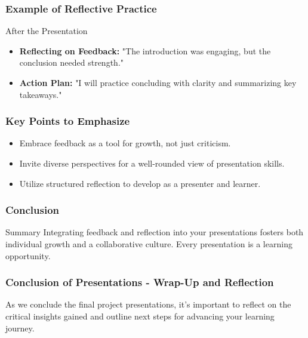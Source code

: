 \documentclass[aspectratio=169]{beamer}
\begin{document}
\begin{frame}[fragile]
    \frametitle{Example of Reflective Practice}
    \begin{block}{After the Presentation}
        \begin{itemize}
            \item \textbf{Reflecting on Feedback:} "The introduction was engaging, but the conclusion needed strength."
            \item \textbf{Action Plan:} "I will practice concluding with clarity and summarizing key takeaways."
        \end{itemize}
    \end{block}
\end{frame}

\begin{frame}[fragile]
    \frametitle{Key Points to Emphasize}
    \begin{itemize}
        \item Embrace feedback as a tool for growth, not just criticism.
        \item Invite diverse perspectives for a well-rounded view of presentation skills.
        \item Utilize structured reflection to develop as a presenter and learner.
    \end{itemize}
\end{frame}

\begin{frame}[fragile]
    \frametitle{Conclusion}
    \begin{block}{Summary}
        Integrating feedback and reflection into your presentations fosters both individual growth and a collaborative culture. Every presentation is a learning opportunity.
    \end{block}
\end{frame}

\begin{frame}[fragile]
    \frametitle{Conclusion of Presentations - Wrap-Up and Reflection}
    As we conclude the final project presentations, it's important to reflect on the critical insights gained and outline next steps for advancing your learning journey.
\end{frame}
\end{document}
